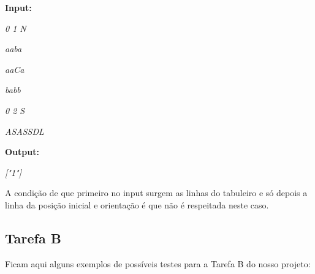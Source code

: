 \documentclass[a4paper, 12pt, portuguese]{article}
\begin{document}
\begin{enumerate}
\begin{enumerate}
\textbf{Input:}

\vspace{2 mm}

\textit{0 1 N}

\textit{aaba}

\textit{aaCa}

\textit{babb}

\textit{0 2 S}

\textit{ASASSDL}

\vspace{2 mm}

\textbf{Output:}

\vspace{2 mm}

\textit{["1"]}

\vspace{4 mm}

A condição de que primeiro no input surgem as linhas do tabuleiro e só depois a linha da posição inicial e orientação é que não é respeitada neste caso.

\end{enumerate}
\end{enumerate}

\subsection{Tarefa B}

Ficam aqui alguns exemplos de possíveis testes para a Tarefa B do nosso projeto:
\end{document}
